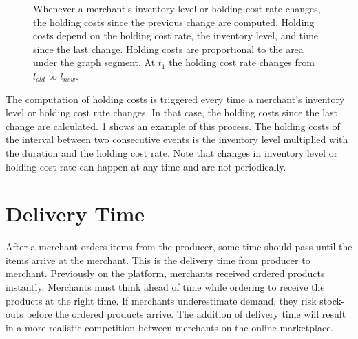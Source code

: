 \begin{figure}[t]
\centering
{}
\caption[Holding costs calculation]{Whenever a merchant's inventory level or holding cost rate changes, the holding costs since the previous change are computed.
	Holding costs depend on the holding cost rate, the inventory level, and time since the last change.
	Holding costs are proportional to the area under the graph segment.
	At $t_1$ the holding cost rate changes from $l_{old}$ to $l_{new}$.}
\label{fig:holding_cost}
\end{figure}

The computation of holding costs is triggered every time a merchant's inventory level or holding cost rate changes.
In that case, the holding costs since the last change are calculated.
\cref{fig:holding_cost} shows an example of this process.
The holding costs of the interval between two consecutive events is the inventory level multiplied with the duration and the holding cost rate.
Note that changes in inventory level or holding cost rate can happen at any time and are not periodically.

\section{Delivery Time}
\label{section:shipping_time}
After a merchant orders items from the producer, some time should pass until the items arrive at the merchant.
This is the delivery time from producer to merchant.
Previously on the \pricewars platform, merchants received ordered products instantly.
Merchants must think ahead of time while ordering to receive the products at the right time.
If merchants underestimate demand, they risk stock-outs before the ordered products arrive.
The addition of delivery time will result in a more realistic competition between merchants on the online marketplace.

